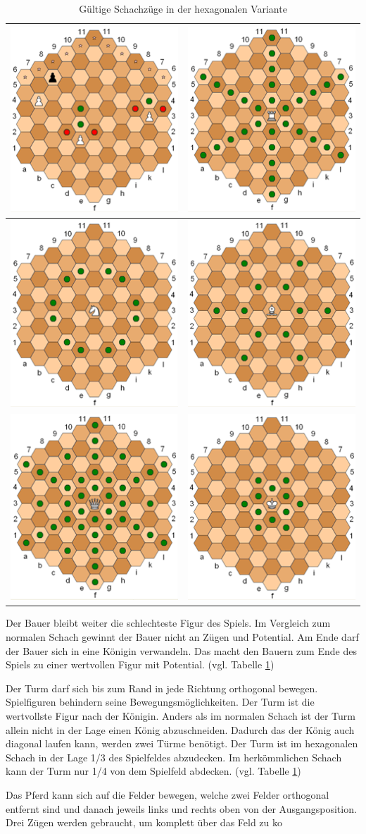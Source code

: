 \begin{table}[H]
    \centering
    \begin{tabular}{|c|c|}
        \hline
        \includegraphics{images/hexPawn.png} & \includegraphics{images/hexRook.png} \\ \hline \includegraphics{images/hexKnight.png} & \includegraphics{images/hexBishop.png} \\ \hline \includegraphics{images/hexQueen.png} & \includegraphics{images/hexKing.png} \\ \hline
    \end{tabular}
    \caption{Gültige Schachzüge in der hexagonalen Variante \protect\footnotemark}
    \label{tab:posMove}
\end{table}
\newpage
Der Bauer bleibt weiter die schlechteste Figur des Spiels. Im Vergleich zum normalen Schach gewinnt der Bauer nicht an Zügen und Potential. Am Ende darf der Bauer sich in eine Königin verwandeln. Das macht den Bauern zum Ende des Spiels zu einer wertvollen Figur mit Potential. \cite{GlinskiHexaChess} (vgl. Tabelle \ref{tab:posMove})\par
Der Turm darf sich bis zum Rand in jede Richtung orthogonal bewegen. Spielfiguren behindern seine Bewegungsmöglichkeiten. Der Turm ist die wertvollste Figur nach der Königin. Anders als im normalen Schach ist der Turm allein nicht in der Lage einen König abzuschneiden. Dadurch das der König auch diagonal laufen kann, werden zwei Türme benötigt. Der Turm ist im hexagonalen Schach in der Lage 1/3 des Spielfeldes abzudecken. Im herkömmlichen Schach kann der Turm nur 1/4 von dem Spielfeld abdecken. \cite{GlinskiHexaChess} (vgl. Tabelle \ref{tab:posMove})\par
Das Pferd kann sich auf die Felder bewegen, welche zwei Felder orthogonal entfernt sind und danach jeweils links und rechts oben von der Ausgangsposition. Drei Zügen werden gebraucht, um komplett über das Feld zu ko